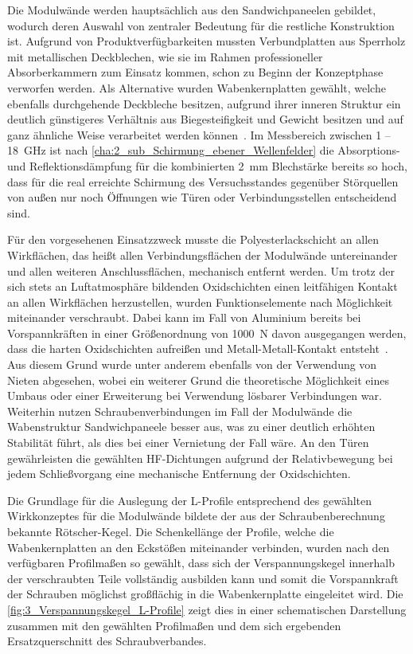 Die Modulwände werden hauptsächlich aus den Sandwichpaneelen gebildet, wodurch deren Auswahl von zentraler Bedeutung für die restliche Konstruktion ist. Aufgrund von Produktverfügbarkeiten mussten Verbundplatten aus Sperrholz mit metallischen Deckblechen, wie sie im Rahmen professioneller Absorberkammern zum Einsatz kommen, schon zu Beginn der Konzeptphase verworfen werden. Als Alternative wurden Wabenkernplatten gewählt, welche ebenfalls durchgehende Deckbleche besitzen, aufgrund ihrer inneren Struktur ein deutlich günstigeres Verhältnis aus Biegesteifigkeit und Gewicht besitzen und auf ganz ähnliche Weise verarbeitet werden können~\cite{Alucore-Datenblatt}. Im Messbereich zwischen 1 -- \SI{18}{\giga\hertz} ist nach \Abschnitt\ref{cha:2_sub_Schirmung_ebener_Wellenfelder} die Absorptions- und Reflektionsdämpfung für die kombinierten \SI{2}{\milli\meter} Blechstärke bereits so hoch, dass für die real erreichte Schirmung des Versuchsstandes gegenüber Störquellen von außen nur noch Öffnungen wie Türen oder Verbindungsstellen entscheidend sind.  
\par
\vspace{\linespace}
Für den vorgesehenen Einsatzzweck musste die Polyesterlackschicht an allen Wirkflächen, das heißt allen Verbindungsflächen der Modulwände untereinander und allen weiteren Anschlussflächen, mechanisch entfernt werden. Um trotz der sich stets an Luftatmosphäre bildenden Oxidschichten einen leitfähigen Kontakt an allen Wirkflächen herzustellen, wurden Funktionselemente nach Möglichkeit miteinander verschraubt. Dabei kann im Fall von Aluminium bereits bei Vorspannkräften in einer Größenordnung von \SI{1000}{\newton} davon ausgegangen werden, dass die harten Oxidschichten aufreißen und Metall-Metall-Kontakt entsteht~\cite{Projektarbeit}. Aus diesem Grund wurde unter anderem ebenfalls von der Verwendung von Nieten abgesehen, wobei ein weiterer Grund die theoretische Möglichkeit eines Umbaus oder einer Erweiterung bei Verwendung lösbarer Verbindungen war. Weiterhin nutzen Schraubenverbindungen im Fall der Modulwände die Wabenstruktur Sandwichpaneele besser aus, was zu einer deutlich erhöhten Stabilität führt, als dies bei einer Vernietung der Fall wäre. An den Türen gewährleisten die gewählten HF-Dichtungen aufgrund der Relativbewegung bei jedem Schließvorgang eine mechanische Entfernung der Oxidschichten.
\par
\vspace{\linespace}
Die Grundlage für die Auslegung der L-Profile entsprechend des gewählten Wirkkonzeptes für die Modulwände bildete der aus der Schraubenberechnung bekannte Rötscher-Kegel. Die Schenkellänge der Profile, welche die Wabenkernplatten an den Eckstößen miteinander verbinden, wurden nach den verfügbaren Profilmaßen so gewählt, dass sich der Verspannungskegel innerhalb der verschraubten Teile vollständig ausbilden kann und somit die Vorspannkraft der Schrauben möglichst großflächig in die Wabenkernplatte eingeleitet wird. Die \Abb\ref{fig:3_Verspannungskegel_L-Profile} zeigt dies in einer schematischen Darstellung zusammen mit den gewählten Profilmaßen und dem sich ergebenden Ersatzquerschnitt des Schraubverbandes. 

